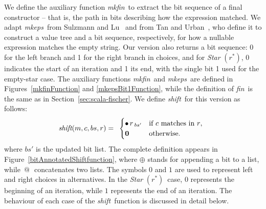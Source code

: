 \documentclass[12pt]{article}
\makeatletter
\newcommand{\ZERO}{\textbf{0}}
\newcommand{\shift}{\textit{shift}}
\newcommand{\mkeps}{\textit{mkeps}}
\newcommand{\Marked}[1]{\bullet\,#1}
\newcommand{\fin}{\textit{fin}}
\newcommand{\mkfin}{\textit{mkfin}}
\newcommand{\STARText}{\textit{Star} $(r^*)$}
\newcommand{\At}{$\,@\,$}
\makeatother
\begin{document}
We define the auxiliary function \mkfin\ to extract the bit sequence of a final constructor -- 
that is, the path in bits describing how the expression matched.  
We adapt \mkeps\ from Sulzmann and Lu~\cite{Sulzmann2014} and from Tan and Urban~\cite{TanAndUrban2023}, 
who define it to construct a value tree and a bit sequence, respectively, 
for how a nullable expression matches the empty string.  
Our version also returns a bit sequence: 0 for the left branch and 1 for the right branch in choices, 
and for \STARText, 0 indicates the start of an iteration and 1 its end, 
with the single bit 1 used for the empty-star case. 
The auxiliary functions \mkfin\ and \mkeps\ are defined
 in Figures~\ref{mkfinFunction} and \ref{mkepsBit1Function}, while the definition of \fin\ is the same as in
  Section~\ref{sec:scala-fischer}. We define \shift\ for this version as follows:
\[
\renewcommand{\arraystretch}{1.5}
\shift(m, c, bs, r) =
\begin{array}{l}
  \begin{cases}
    \Marked{r\,_{bs'}} & \text{if $c$ matches in $r$}, \\
    \ZERO\,        & \text{otherwise.}
  \end{cases} 

\end{array}
\renewcommand{\arraystretch}{1.0}
\]
where $bs'$ is the updated bit list. The complete definition appears in Figure~\ref{bitAnnotatedShiftfunction}, where $\oplus$
 stands for appending a bit to a list, while \At\ concatenates two lists.  
The symbols $0$ and $1$ are used to represent left and right choices in alternatives.  
In the \STARText\ case, $0$ represents the beginning of an iteration, while $1$ represents the end of an iteration. 
The behaviour of each case of the \shift\ function is discussed in detail below.
\end{document}
